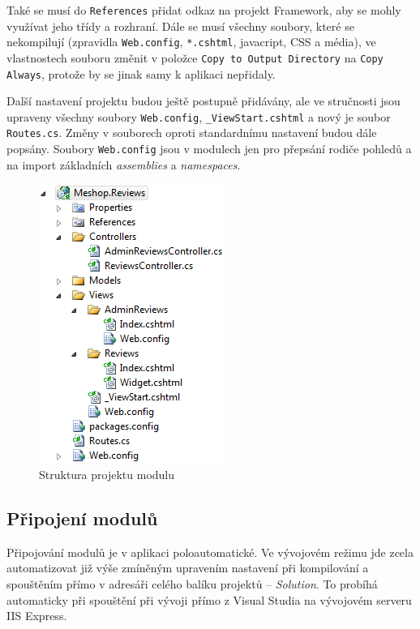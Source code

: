 \documentclass[11pt,twoside,a4paper]{book}
\begin{document}
Také se musí do \texttt{References} přidat odkaz na projekt \textsf{Framework}, aby se mohly využívat jeho třídy a rozhraní. Dále se musí všechny soubory, které se nekompilují (zpravidla \texttt{Web.config}, \texttt{*.cshtml}, javacript, CSS a média), ve vlastnostech souboru změnit v položce \texttt{Copy to Output Directory} na \texttt{Copy Always}, protože by se jinak samy k aplikaci nepřidaly.

Další nastavení projektu budou ještě postupně přidávány, ale ve stručnosti jsou upraveny všechny soubory \texttt{Web.config}, \texttt{\_ViewStart.cshtml} a nový je soubor \texttt{Routes.cs}. Změny v souborech oproti standardnímu nastavení budou dále popsány. Soubory \texttt{Web.config} jsou v modulech jen pro přepsání rodiče pohledů a na import základních \textit{assemblies} a \textit{namespaces}.
\begin{figure}[h!]
\begin{center}
\includegraphics[scale=1]{figures/modulstruktura}
\caption{Struktura projektu modulu}
\label{fig:modulstruktura}
\end{center}
\end{figure}

\subsection{Připojení modulů}
\label{subsec:pripojenimodulu}

Připojování modulů je v aplikaci poloautomatické. Ve vývojovém režimu jde zcela automatizovat již výše zmíněným upravením nastavení při kompilování a spouštěním přímo v adresáři celého balíku projektů -- \textit{Solution}. To probíhá automaticky při spouštění při vývoji přímo z Visual Studia na vývojovém serveru IIS Express.
\end{document}
